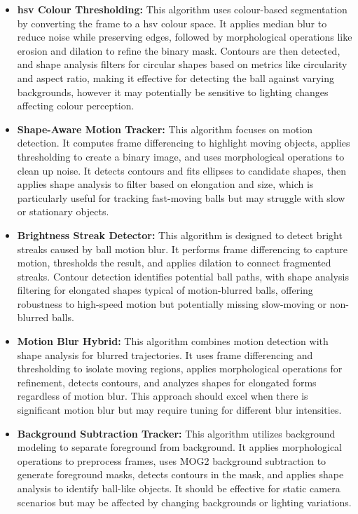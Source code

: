 \documentclass[12pt,a4paper]{article}
\begin{document}
\begin{itemize}
    \item \textbf{\acs{hsv} Colour Thresholding:} This algorithm uses colour-based segmentation by converting the frame to a \acs{hsv} colour space. It applies median blur to reduce noise while preserving edges, followed by morphological operations like erosion and dilation to refine the binary mask. Contours are then detected, and shape analysis filters for circular shapes based on metrics like circularity and aspect ratio, making it effective for detecting the ball against varying backgrounds, however it may potentially be sensitive to lighting changes affecting colour perception.
    
    \item \textbf{Shape-Aware Motion Tracker:} This algorithm focuses on motion detection. It computes frame differencing to highlight moving objects, applies thresholding to create a binary image, and uses morphological operations to clean up noise. It detects contours and fits ellipses to candidate shapes, then applies shape analysis to filter based on elongation and size, which is particularly useful for tracking fast-moving balls but may struggle with slow or stationary objects.
    
    \item \textbf{Brightness Streak Detector:} This algorithm is designed to detect bright streaks caused by ball motion blur. It performs frame differencing to capture motion, thresholds the result, and applies dilation to connect fragmented streaks. Contour detection identifies potential ball paths, with shape analysis filtering for elongated shapes typical of motion-blurred balls, offering robustness to high-speed motion but potentially missing slow-moving or non-blurred balls.

    \item \textbf{Motion Blur Hybrid:} This algorithm combines motion detection with shape analysis for blurred trajectories. It uses frame differencing and thresholding to isolate moving regions, applies morphological operations for refinement, detects contours, and analyzes shapes for elongated forms regardless of motion blur. This approach should excel when there is significant motion blur but may require tuning for different blur intensities.

    \item \textbf{Background Subtraction Tracker:} This algorithm utilizes background modeling to separate foreground from background. It applies morphological operations to preprocess frames, uses MOG2 background subtraction to generate foreground masks, detects contours in the mask, and applies shape analysis to identify ball-like objects. It should be effective for static camera scenarios but may be affected by changing backgrounds or lighting variations.
    

\end{itemize}
\end{document}
